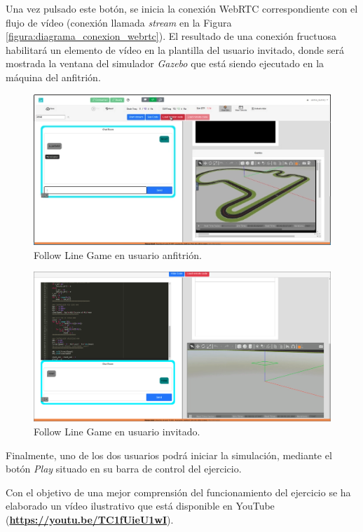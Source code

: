 \documentclass[a4paper, 12pt]{book}
\begin{document}
Una vez pulsado este botón, se inicia la conexión WebRTC correspondiente con el flujo de vídeo (conexión llamada \emph{stream} en la Figura \ref{figura:diagrama_conexion_webrtc}). El resultado de una conexión fructuosa habilitará un elemento de vídeo en la plantilla del usuario invitado, donde será mostrada la ventana del simulador \emph{Gazebo} que está siendo ejecutado en la máquina del anfitrión.

  \begin{figure}[H]
  	\centering
    \includegraphics[width=\textwidth]{img/host_gazebo.png}
    \caption{Follow Line Game en usuario anfitrión.}
  \end{figure}
  \begin{figure}[H]
  	\centering
    \includegraphics[width=\textwidth]{img/inv_gazebo.png}
    \caption{Follow Line Game en usuario invitado.}
  \end{figure}

Finalmente, uno de los dos usuarios podrá iniciar la simulación, mediante el botón \emph{Play} situado en su barra de control del ejercicio.

Con el objetivo de una mejor comprensión del funcionamiento del ejercicio se ha elaborado un vídeo ilustrativo que está disponible en YouTube (\textbf{\url{https://youtu.be/TC1fUieU1wI}}).
\end{document}
